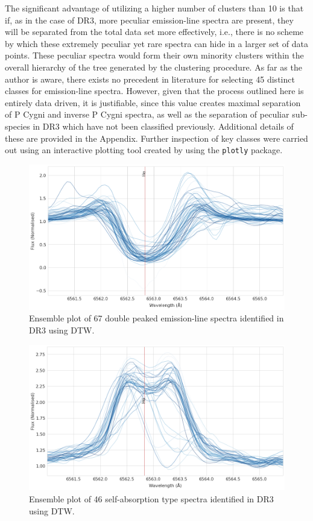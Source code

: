 The significant advantage of utilizing a higher number of clusters than 10 is that if, as in the case of DR3, more peculiar emission-line spectra are present, they will be separated from the total data set more effectively, i.e., there is no scheme by which these extremely peculiar yet rare spectra can hide in a larger set of data points. These peculiar spectra would form their own minority clusters within the overall hierarchy of the tree generated by the clustering procedure. As far as the author is aware, there exists no precedent in literature for selecting 45 distinct classes for emission-line spectra. However, given that the process outlined here is entirely data driven, it is justifiable, since this value creates maximal separation of P Cygni and inverse P Cygni spectra, as well as the separation of peculiar sub-species in DR3 which have not been classified previously. Additional details of these are provided in the Appendix. Further inspection of key classes were carried out using an interactive plotting tool created by using the \texttt{plotly} package.

\begin{figure}[!htb]
\centering
\includegraphics[scale=0.45]{figures/double peak 1.png}
\caption{Ensemble plot of 67 double peaked emission-line spectra identified in DR3 using DTW.}
\end{figure}

\begin{figure}[!htb]
\centering
\includegraphics[scale=0.45]{figures/emission on abs.png}
\caption{Ensemble plot of 46 self-absorption type spectra identified in DR3 using DTW.}
\end{figure}

